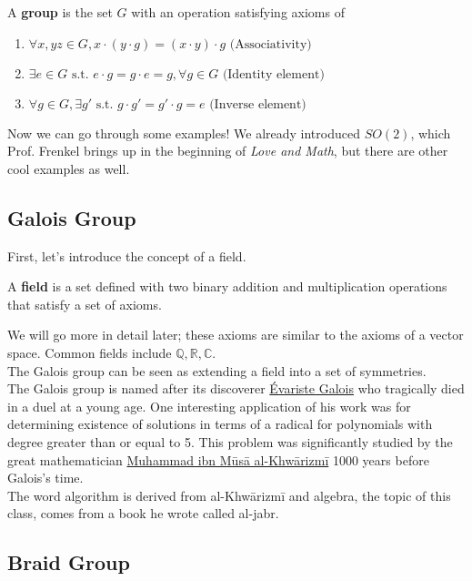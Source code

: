 \documentclass{report}
\begin{document}
\theoremstyle{definition}
\begin{definition}
A \textbf{group} is the set $G$ with an operation satisfying axioms of
\begin{enumerate}
    \item $\forall x, y z \in G, x \cdot (y \cdot g) = (x \cdot y) \cdot g \text{ (Associativity)}$
    \item $\exists e \in G \text{ s.t. } e \cdot g = g \cdot e = g, \forall g \in G \text{ (Identity element)}$
    \item $\forall g \in G, \exists g' \text{ s.t. } g \cdot g' = g' \cdot g = e \text{ (Inverse element)}$
\end{enumerate}
\end{definition}

Now we can go through some examples!
We already introduced $SO(2)$, which Prof. Frenkel brings up in the beginning of \textit{Love and Math}, but there are other cool examples as well.

\subsection{Galois Group}
First, let's introduce the concept of a field.
\theoremstyle{definition}
\begin{definition}
A \textbf{field} is a set defined with two binary addition and multiplication operations that satisfy a set of axioms.
\end{definition}
We will go more in detail later; these axioms are similar to the axioms of a vector space.
Common fields include $\mathbb{Q}, \mathbb{R}, \mathbb{C}$. \\
The Galois group can be seen as extending a field into a set of symmetries.\\
The Galois group is named after its discoverer \href{https://en.wikipedia.org/wiki/%C3%89variste_Galois}{Évariste Galois} who tragically died in a duel at a young age.
One interesting application of his work was for determining existence of solutions in terms of a radical for polynomials with degree greater than or equal to 5.
This problem was significantly studied by the great mathematician \href{https://en.wikipedia.org/wiki/Muhammad_ibn_Musa_al-Khwarizmi}{Muhammad ibn Mūsā al-Khwārizmī} 1000 years before Galois's time.\\
The word algorithm is derived from al-Khwārizmī and algebra, the topic of this class, comes from a book he wrote called al-jabr.

\subsection{Braid Group}
\end{document}
